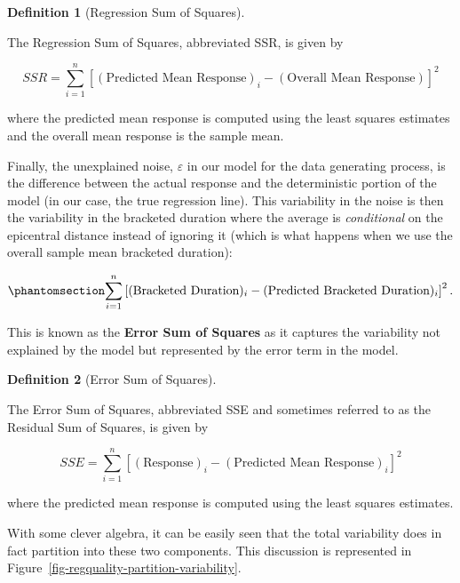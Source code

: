 \documentclass[
  letterpaper,
  DIV=11,
  numbers=noendperiod]{scrreprt}
\theoremstyle{definition}
\newtheorem{definition}{Definition}[chapter]
\theoremstyle{definition}
\theoremstyle{plain}
\theoremstyle{remark}
\begin{document}
\begin{definition}[Regression Sum of
Squares]\protect\hypertarget{def-ssr}{}\label{def-ssr}

The Regression Sum of Squares, abbreviated SSR, is given by

\[SSR = \sum_{i=1}^{n} \left[(\text{Predicted Mean Response})_i - (\text{Overall Mean Response})\right]^2\]

where the predicted mean response is computed using the least squares
estimates and the overall mean response is the sample mean.

\end{definition}

Finally, the unexplained noise, \(\varepsilon\) in our model for the
data generating process, is the difference between the actual response
and the deterministic portion of the model (in our case, the true
regression line). This variability in the noise is then the variability
in the bracketed duration where the average is \emph{conditional} on the
epicentral distance instead of ignoring it (which is what happens when
we use the overall sample mean bracketed duration):

\begin{equation}\phantomsection\label{eq-regquality-sse}{\sum_{i=1}^{n} \left[(\text{Bracketed Duration})_i - (\text{Predicted Bracketed Duration})_i\right]^2.}\end{equation}

This is known as the \textbf{Error Sum of Squares} as it captures the
variability not explained by the model but represented by the error term
in the model.

\begin{definition}[Error Sum of
Squares]\protect\hypertarget{def-sse}{}\label{def-sse}

The Error Sum of Squares, abbreviated SSE and sometimes referred to as
the Residual Sum of Squares, is given by

\[SSE = \sum_{i=1}^{n} \left[(\text{Response})_i - (\text{Predicted Mean Response})_i\right]^2\]

where the predicted mean response is computed using the least squares
estimates.

\end{definition}

With some clever algebra, it can be easily seen that the total
variability does in fact partition into these two components. This
discussion is represented in
Figure~\ref{fig-regquality-partition-variability}.
\end{document}
